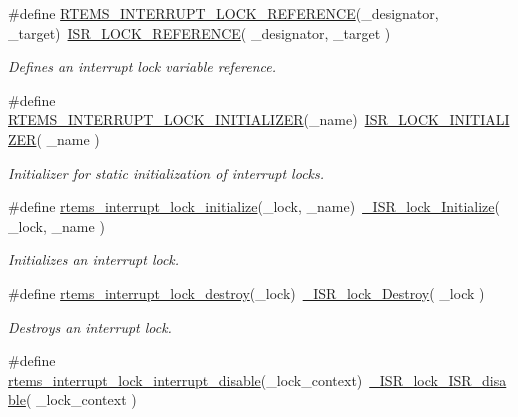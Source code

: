 \begin{DoxyCompactItemize}
\#define \mbox{\hyperlink{group__ClassicINTRLocks_ga3ca17a87f1b9beb929be89357a9a196d}{R\+T\+E\+M\+S\+\_\+\+I\+N\+T\+E\+R\+R\+U\+P\+T\+\_\+\+L\+O\+C\+K\+\_\+\+R\+E\+F\+E\+R\+E\+N\+CE}}(\+\_\+designator,  \+\_\+target)~\mbox{\hyperlink{group__RTEMSScoreISRLocks_gad41ddc507bfa7022bd9355ff252888d2}{I\+S\+R\+\_\+\+L\+O\+C\+K\+\_\+\+R\+E\+F\+E\+R\+E\+N\+CE}}( \+\_\+designator, \+\_\+target )
\begin{DoxyCompactList}\small\item\em Defines an interrupt lock variable reference. \end{DoxyCompactList}\item 
\#define \mbox{\hyperlink{group__ClassicINTRLocks_ga8a9392920390007da5a660cb9570077f}{R\+T\+E\+M\+S\+\_\+\+I\+N\+T\+E\+R\+R\+U\+P\+T\+\_\+\+L\+O\+C\+K\+\_\+\+I\+N\+I\+T\+I\+A\+L\+I\+Z\+ER}}(\+\_\+name)~\mbox{\hyperlink{group__RTEMSScoreISRLocks_ga5fd39a446bb4cfbfc53838fd434d5f6c}{I\+S\+R\+\_\+\+L\+O\+C\+K\+\_\+\+I\+N\+I\+T\+I\+A\+L\+I\+Z\+ER}}( \+\_\+name )
\begin{DoxyCompactList}\small\item\em Initializer for static initialization of interrupt locks. \end{DoxyCompactList}\item 
\#define \mbox{\hyperlink{group__ClassicINTRLocks_gab8417ae3bed7e8164f7e2212ea9c40bb}{rtems\+\_\+interrupt\+\_\+lock\+\_\+initialize}}(\+\_\+lock,  \+\_\+name)~\mbox{\hyperlink{group__RTEMSScoreISRLocks_gafeb5128bdf7cc2d29f9f51a85a7d0220}{\+\_\+\+I\+S\+R\+\_\+lock\+\_\+\+Initialize}}( \+\_\+lock, \+\_\+name )
\begin{DoxyCompactList}\small\item\em Initializes an interrupt lock. \end{DoxyCompactList}\item 
\#define \mbox{\hyperlink{group__ClassicINTRLocks_ga9e47f2e9340ccb71de752ccfd6e8c534}{rtems\+\_\+interrupt\+\_\+lock\+\_\+destroy}}(\+\_\+lock)~\mbox{\hyperlink{group__RTEMSScoreISRLocks_ga918784c3c13a2fb3a27173cbc471285a}{\+\_\+\+I\+S\+R\+\_\+lock\+\_\+\+Destroy}}( \+\_\+lock )
\begin{DoxyCompactList}\small\item\em Destroys an interrupt lock. \end{DoxyCompactList}\item 
\#define \mbox{\hyperlink{group__ClassicINTRLocks_gab842e35c9bb90fa48365289f492f55b2}{rtems\+\_\+interrupt\+\_\+lock\+\_\+interrupt\+\_\+disable}}(\+\_\+lock\+\_\+context)~\mbox{\hyperlink{group__RTEMSScoreISRLocks_ga36d91ceed1df931ce6291d7bc9e60573}{\+\_\+\+I\+S\+R\+\_\+lock\+\_\+\+I\+S\+R\+\_\+disable}}( \+\_\+lock\+\_\+context )

\end{DoxyCompactItemize}
